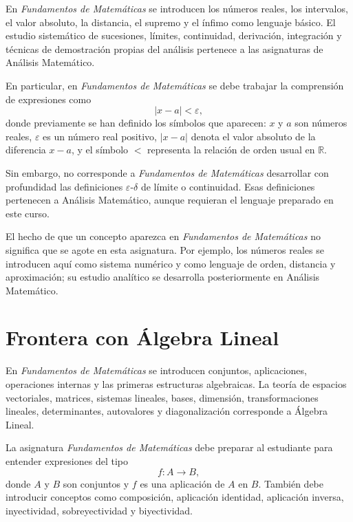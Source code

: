 \begin{convencion}
En \emph{Fundamentos de Matemáticas} se introducen los números reales, los intervalos, el valor absoluto, la distancia, el supremo y el ínfimo como lenguaje básico. El estudio sistemático de sucesiones, límites, continuidad, derivación, integración y técnicas de demostración propias del análisis pertenece a las asignaturas de Análisis Matemático.
\end{convencion}

En particular, en \emph{Fundamentos de Matemáticas} se debe trabajar la comprensión de expresiones como
\[
  |x-a|<\varepsilon,
\]
donde previamente se han definido los símbolos que aparecen: \(x\) y \(a\) son números reales, \(\varepsilon\) es un número real positivo, \(|x-a|\) denota el valor absoluto de la diferencia \(x-a\), y el símbolo \(<\) representa la relación de orden usual en \(\mathbb{R}\).

Sin embargo, no corresponde a \emph{Fundamentos de Matemáticas} desarrollar con profundidad las definiciones \(\varepsilon\)-\(\delta\) de límite o continuidad. Esas definiciones pertenecen a Análisis Matemático, aunque requieran el lenguaje preparado en este curso.

\begin{advertencia}
El hecho de que un concepto aparezca en \emph{Fundamentos de Matemáticas} no significa que se agote en esta asignatura. Por ejemplo, los números reales se introducen aquí como sistema numérico y como lenguaje de orden, distancia y aproximación; su estudio analítico se desarrolla posteriormente en Análisis Matemático.
\end{advertencia}

\section{Frontera con Álgebra Lineal}

\begin{convencion}
En \emph{Fundamentos de Matemáticas} se introducen conjuntos, aplicaciones, operaciones internas y las primeras estructuras algebraicas. La teoría de espacios vectoriales, matrices, sistemas lineales, bases, dimensión, transformaciones lineales, determinantes, autovalores y diagonalización corresponde a Álgebra Lineal.
\end{convencion}

La asignatura \emph{Fundamentos de Matemáticas} debe preparar al estudiante para entender expresiones del tipo
\[
  f:A\longrightarrow B,
\]
donde \(A\) y \(B\) son conjuntos y \(f\) es una aplicación de \(A\) en \(B\). También debe introducir conceptos como composición, aplicación identidad, aplicación inversa, inyectividad, sobreyectividad y biyectividad.

